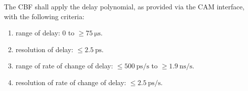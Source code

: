 The CBF shall apply the delay polynomial, as provided via the CAM
interface, with the following criteria:
\begin{enumerate}
\item range of delay: 0 to $\ge \SI{75}{\micro\second}$.
\item resolution of delay: $\le \SI{2.5}{\pico\second}$.
\item range of rate of change of delay:
$\le \SI{500}{\pico\second\per\second}$ to
$\ge \SI{1.9}{\nano\second\per\second}$.
\item resolution of rate of change of delay:
$\le \SI{2.5}{\pico\second\per\second}$.
\end{enumerate}

